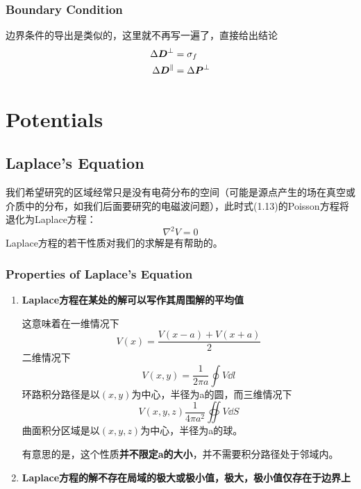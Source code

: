 \documentclass[14pt,oneside]{book}
\begin{document}
\begin{large}
\subsection{Boundary Condition}
边界条件的导出是类似的，这里就不再写一遍了，直接给出结论
\begin{equation}
  \begin{aligned}
	 \Delta \vb*{D}^\perp &= \sigma_f 	\\
	 \Delta \vb*{D}^\parallel &=\Delta \vb*{P}^\perp
\end{aligned}
\end{equation}

\chapter{Potentials}
\section{Laplace's Equation}
我们希望研究的区域经常只是没有电荷分布的空间（可能是源点产生的场在真空或介质中的分布，如我们后面要研究的电磁波问题），此时式(1.13)的Poisson方程将退化为Laplace方程：
\begin{equation}
  \nabla^2{V}=0
\end{equation}
Laplace方程的若干性质对我们的求解是有帮助的。
\subsection{Properties of Laplace's Equation}
\begin{enumerate}
  \item \textbf{Laplace方程在某处的解可以写作其周围解的平均值}
  
  这意味着在一维情况下
  \begin{equation}
  V(x)=\frac{V(x-a)+V(x+a)}{2}
\end{equation}
二维情况下
\begin{equation}
  V(x,y)=\frac{1}{2\pi a}\oint V \dd l
\end{equation}
环路积分路径是以$(x,y)$为中心，半径为a的圆，而三维情况下
\begin{equation}
  V(x,y,z)\frac{1}{4\pi a^2}\oiint V\dd S
\end{equation}
曲面积分区域是以$(x,y,z)$为中心，半径为a的球。

有意思的是，这个性质\textbf{并不限定a的大小}，并不需要积分路径处于邻域内。
\item \textbf{Laplace方程的解不存在局域的极大或极小值，极大，极小值仅存在于边界上}


\end{enumerate}
\end{large}
\end{document}

